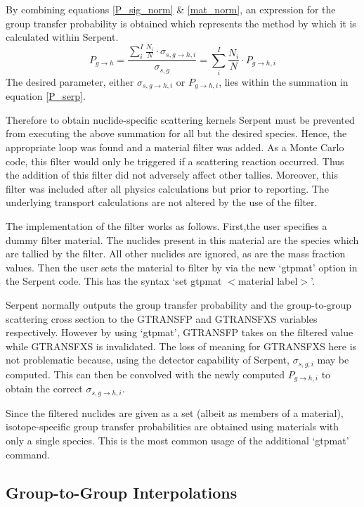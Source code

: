 \documentclass{physor2012}
\begin{document}
By combining equations \ref{P_sig_norm} \& \ref{mat_norm}, an expression for the
group transfer probability is obtained which represents the method by which it
is calculated within Serpent.
\begin{equation}
\label{P_serp}
P_{g\to h} = \frac{\sum_i^I \frac{N_i}{N} \cdot \sigma_{s,g\to h,i}}{\sigma_{s,g}} 
           = \sum_i^I \frac{N_i}{N} \cdot P_{g\to h,i}
\end{equation}
The desired parameter, either $\sigma_{s,g\to h,i}$ or $P_{g\to h,i}$, lies within
the summation in equation \ref{P_serp}.

Therefore to obtain nuclide-specific scattering kernels Serpent must be prevented
from executing the above summation for all but the desired species.  Hence, the
appropriate loop was found and a material filter was added.  As a Monte Carlo code,
this filter would only be triggered if a scattering reaction occurred.  Thus the
addition of this filter did not adversely affect other tallies.  Moreover, this
filter was included after all physics calculations but prior to reporting.  The
underlying transport calculations are not altered by the use of the filter.

The implementation of the filter works as follows. First,the user specifies
a dummy filter material.  The nuclides present in this material are the species
which are tallied by the filter.  All other nuclides are ignored, as are the mass
fraction values.  Then the user sets the material to filter by via the new `gtpmat'
option in the Serpent code.  This has the syntax `set gtpmat $<$material label$>$'.

Serpent normally outputs the group transfer probability and the group-to-group
scattering cross section to the GTRANSFP and GTRANSFXS variables respectively.
However by using `gtpmat', GTRANSFP takes on the filtered value while GTRANSFXS
is invalidated.  The loss of meaning for GTRANSFXS here is not problematic
because, using the detector capability of Serpent, $\sigma_{s,g,i}$ may be computed.
This can then be convolved with the newly computed $P_{g\to h,i}$ to obtain
the correct $\sigma_{s,g\to h,i}$.

Since the filtered nuclides are given as a set (albeit as members of a material),
isotope-specific group transfer probabilities are obtained using materials with
only a single species.  This is the most common usage of the additional `gtpmat'
command.

\subsection{Group-to-Group Interpolations}
\end{document}
